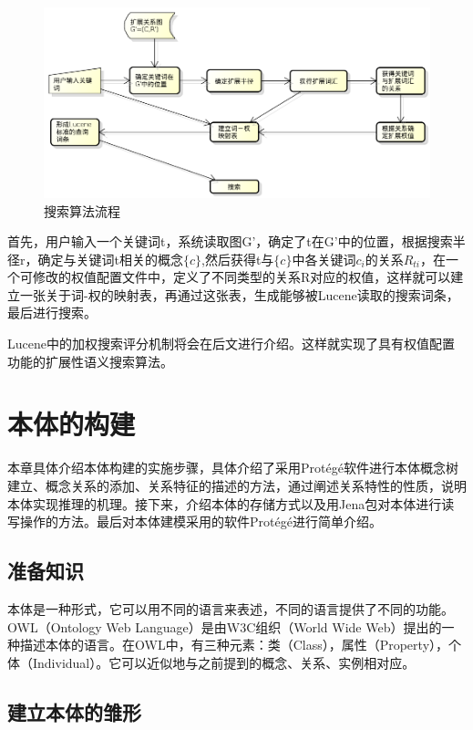 \documentclass[12pt,a4paper]{article}
\begin{document}
	\begin{figure}[htbp] 
	\centering\includegraphics[width=5in]{fig/searchFlow.png} 
	\caption{搜索算法流程}\label{fig:搜索算法流程} 
	\end{figure} 
	
	首先，用户输入一个关键词t，系统读取图G'，确定了t在G'中的位置，根据搜索半径r，确定与关键词t相关的概念$\{c\}$,然后获得t与$\{c\}$中各关键词$c_{i}$的关系$R_{ti}$，在一个可修改的权值配置文件中，定义了不同类型的关系R对应的权值，这样就可以建立一张关于词-权的映射表，再通过这张表，生成能够被Lucene读取的搜索词条，最后进行搜索。
	
	Lucene中的加权搜索评分机制将会在后文进行介绍。这样就实现了具有权值配置功能的扩展性语义搜索算法。

\newpage
\section{本体的构建}
\setcounter{figure}{0}
\setcounter{table}{0}
\setcounter{equation}{0}
	本章具体介绍本体构建的实施步骤，具体介绍了采用Prot{\'e}g{\'e}软件进行本体概念树建立、概念关系的添加、关系特征的描述的方法，通过阐述关系特性的性质，说明本体实现推理的机理。接下来，介绍本体的存储方式以及用Jena包对本体进行读写操作的方法。最后对本体建模采用的软件Prot{\'e}g{\'e}进行简单介绍。

	\subsection{准备知识}
	本体是一种形式，它可以用不同的语言来表述，不同的语言提供了不同的功能。OWL（Ontology Web Language）是由W3C组织（World Wide Web）提出的一种描述本体的语言。在OWL中，有三种元素：类（Class），属性（Property），个体（Individual）。它可以近似地与之前提到的概念、关系、实例相对应。
		
	\subsection{建立本体的雏形}
	
\end{document}
